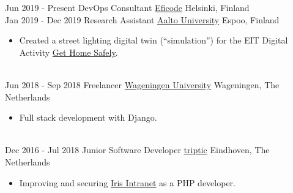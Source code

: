 \documentclass[a4paper]{twentysecondcv} %
\begin{document}
\begin{twentyshort} %
    \twentyitem
    	{Jun 2019 -}
		{Present}
        {DevOps Consultant}
		{\href{https://eficode.com}{Eficode}}
        {Helsinki, Finland}
        {%
        }
        \\
    \twentyitem
    	{Jan 2019 -}
		{Dec 2019}
        {Research Assistant}
		{\href{https://www.aalto.fi/en}{Aalto University}}
        {Espoo, Finland}
        {
        \begin{itemize}
			\item Created a street lighting digital twin (``simulation'') for the EIT Digital Activity \href{https://cyphylab.chora.tu-berlin.de/gethomesafely/}{Get Home Safely}.
        \end{itemize}
        }
        \\
    \twentyitem
    	{Jun 2018 -}
		{Sep 2018}
        {Freelancer}
		{\href{https://wur.nl/en}{Wageningen University}}
        {Wageningen, The Netherlands}
        {
        \begin{itemize}
            \item Full stack development with Django.
        \end{itemize}
        }
        \\
    \twentyitem
    	{Dec 2016 -}
		{Jul 2018}
        {Junior Software Developer}
		{\href{https://www.triptic.nl/}{triptic}}
        {Eindhoven, The Netherlands}
        {
        \begin{itemize}
            \item Improving and securing \href{https://www.irisintranet.com/}{Iris Intranet} as a PHP developer.
        \end{itemize}
        }
\end{twentyshort}

\end{document}
